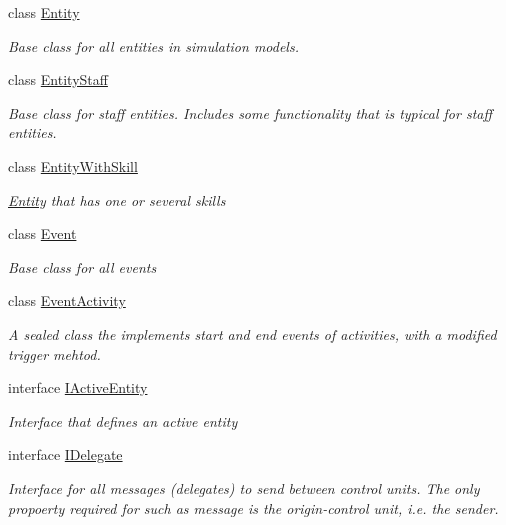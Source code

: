 \begin{DoxyCompactItemize}
class \hyperlink{class_simulation_core_1_1_h_c_c_m_elements_1_1_entity}{Entity}
\begin{DoxyCompactList}\small\item\em Base class for all entities in simulation models. \end{DoxyCompactList}\item 
class \hyperlink{class_simulation_core_1_1_h_c_c_m_elements_1_1_entity_staff}{Entity\+Staff}
\begin{DoxyCompactList}\small\item\em Base class for staff entities. Includes some functionality that is typical for staff entities. \end{DoxyCompactList}\item 
class \hyperlink{class_simulation_core_1_1_h_c_c_m_elements_1_1_entity_with_skill}{Entity\+With\+Skill}
\begin{DoxyCompactList}\small\item\em \hyperlink{class_simulation_core_1_1_h_c_c_m_elements_1_1_entity}{Entity} that has one or several skills \end{DoxyCompactList}\item 
class \hyperlink{class_simulation_core_1_1_h_c_c_m_elements_1_1_event}{Event}
\begin{DoxyCompactList}\small\item\em Base class for all events \end{DoxyCompactList}\item 
class \hyperlink{class_simulation_core_1_1_h_c_c_m_elements_1_1_event_activity}{Event\+Activity}
\begin{DoxyCompactList}\small\item\em A sealed class the implements start and end events of activities, with a modified trigger mehtod. \end{DoxyCompactList}\item 
interface \hyperlink{interface_simulation_core_1_1_h_c_c_m_elements_1_1_i_active_entity}{I\+Active\+Entity}
\begin{DoxyCompactList}\small\item\em Interface that defines an active entity \end{DoxyCompactList}\item 
interface \hyperlink{interface_simulation_core_1_1_h_c_c_m_elements_1_1_i_delegate}{I\+Delegate}
\begin{DoxyCompactList}\small\item\em Interface for all messages (delegates) to send between control units. The only propoerty required for such as message is the origin-\/control unit, i.\+e. the sender. \end{DoxyCompactList}\item 

\end{DoxyCompactItemize}
